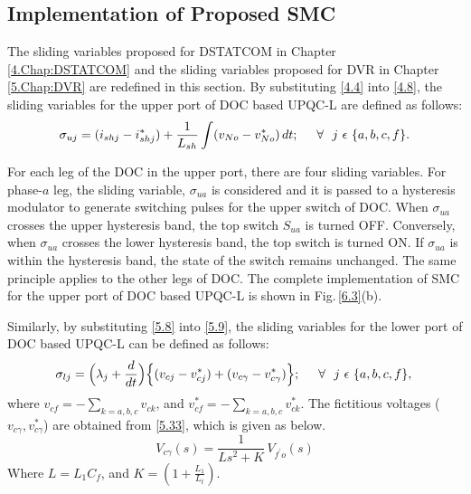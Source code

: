 \subsection{Implementation of Proposed SMC}
The sliding variables proposed for DSTATCOM in Chapter \ref{4.Chap:DSTATCOM} and the sliding variables proposed for DVR in Chapter \ref{5.Chap:DVR} are redefined in this section. By substituting \eqref{4.4} into \eqref{4.8}, the sliding variables for the upper port of DOC based UPQC-L are defined as follows:
\begin{equation} \label{6.10}
\sigma_{uj} = (i_{shj} - i^{*}_{shj} ) + \frac{1}{L_{sh}} \int (v_{No} - v^{*}_{No}) \, dt; \hspace{0.5cm} \forall ~~ j ~ \epsilon ~ \{a,b,c,f\}. \\
\end{equation}

For each leg of the DOC in the upper port, there are four sliding variables. For phase-$a$ leg, the sliding variable, $\sigma_{ua}$ is considered and it is passed to a hysteresis modulator to generate switching pulses for the upper switch of DOC. When $\sigma_{ua}$ crosses the upper hysteresis band, the top switch $S_{ua}$ is turned OFF. Conversely, when $\sigma_{ua}$ crosses the lower hysteresis band, the top switch is turned ON. If $\sigma_{ua}$ is within the hysteresis band, the state of the switch remains unchanged. The same principle applies to the other legs of DOC. The complete implementation of SMC for the upper port of DOC based UPQC-L is shown in Fig.\,\ref{6.3}(b).

Similarly, by substituting \eqref{5.8} into \eqref{5.9}, the sliding variables for the lower port of DOC based UPQC-L can be defined as follows:
\begin{equation} \label{6.11}
\sigma_{lj} = \Big(\lambda_{j} + \frac{d}{dt} \Big) \Big\{ (v_{cj} - v^{*}_{cj}) + (v_{c\gamma} - v^{*}_{c\gamma}) \Big\}; \hspace{0.5cm} \forall ~~ j ~ \epsilon ~ \{a,b,c,f\}, \\
\end{equation}
where $v_{cf} = - \sum_{k = a,b,c} v_{ck}$, and $v^{*}_{cf} = - \sum_{k = a,b,c} v^{*}_{ck}$. The fictitious voltages ($v_{c\gamma}, v^{*}_{c\gamma} $) are obtained from \eqref{5.33}, which is given as below.
\begin{equation} \label{6.12}
V_{c\gamma}(s) = \frac{1}{Ls^{2} + K}\,V_{f^{\prime}o}(s)
\end{equation}
Where $L = L_1C_f$, and $K = (1 + \frac{L_{1}}{L_{t}} ) $.

